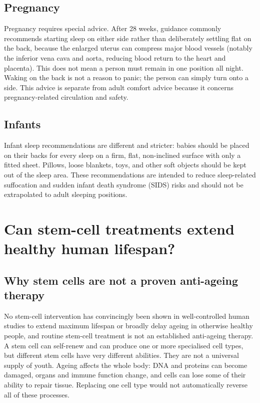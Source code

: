 \documentclass[11pt,oneside]{report}
\begin{document}
\subsection*{Pregnancy}

Pregnancy requires special advice. After 28 weeks, guidance commonly recommends
starting sleep on either side rather than deliberately settling flat on the
back, because the enlarged uterus can compress major blood vessels (notably the
inferior vena cava and aorta, reducing blood return to the heart and placenta). This does not
mean a person must remain in one position all night. Waking on the back is not a
reason to panic; the person can simply turn onto a side. This advice is separate
from adult comfort advice because it concerns pregnancy-related circulation and
safety.

\subsection*{Infants}

Infant sleep recommendations are different and stricter: babies should be
placed on their backs for every sleep on a firm, flat, non-inclined surface with
only a fitted sheet. Pillows, loose blankets, toys, and other soft objects
should be kept out of the sleep area. These recommendations are intended to
reduce sleep-related suffocation and sudden infant death syndrome (SIDS) risks
and should not be extrapolated to adult sleeping positions.

\section{Can stem-cell treatments extend healthy human lifespan?}

\subsection*{Why stem cells are not a proven anti-ageing therapy}

No stem-cell intervention has convincingly been shown in well-controlled human
studies to extend maximum lifespan or broadly delay ageing in otherwise healthy
people, and routine stem-cell treatment is not an established anti-ageing
therapy. A stem cell can self-renew and can produce one or more specialised
cell types, but different stem cells have very different abilities. They are
not a universal supply of youth. Ageing affects the whole body: DNA and
proteins can become damaged, organs and immune function change, and cells can
lose some of their ability to repair tissue. Replacing one cell type would not
automatically reverse all of these processes.
\end{document}
